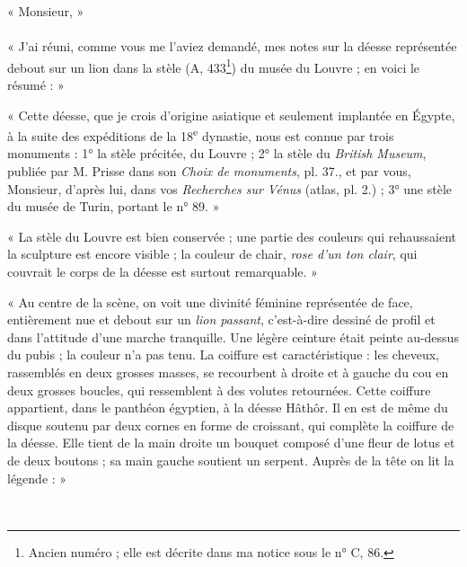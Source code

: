 \documentclass{article}
\newcommand*\hieroAAAG{}
\newcommand*\hieroAAAH{}
\newcommand*\hieroAAAI{}
\newcommand*\hieroAAAJ{}
\newcommand*\hieroAAAK{}
\newcommand*\hieroAAAL{}
\newcommand*\hieroAAAM{}
\newcommand*\hieroAAAN{}
\begin{document}
\begin{center}
« Monsieur, »
\end{center}

\paragraph{}
« J'ai réuni, comme vous me l'aviez demandé, mes notes sur la déesse représentée debout sur un lion dans la stèle (A, 433\footnote{Ancien numéro ; elle est décrite dans ma notice sous le n° C, 86.}) du musée du Louvre ; en voici le résumé : »

« Cette déesse, que je crois d'origine asiatique et seulement implantée en Égypte, à la suite des expéditions de la 18\textsuperscript{e} dynastie, nous est connue par trois monuments : 1° la stèle précitée, du Louvre ; 2° la stèle du \emph{British Museum}, publiée par M. Prisse dans son \emph{Choix de monuments}, pl. 37., et par vous, Monsieur, d'après lui, dans vos \emph{Recherches sur Vénus} (atlas, pl. 2.) ; 3° une stèle du musée de Turin, portant le n° 89. »

« La stèle du Louvre est bien conservée ; une partie des couleurs qui rehaussaient la sculpture est encore visible ; la couleur de chair, \emph{rose d'un ton clair}, qui couvrait le corps de la déesse est surtout remarquable. »

« Au centre de la scène, on voit une divinité féminine représentée de face, entièrement nue et debout sur un \emph{lion passant}, c'est-à-dire dessiné de profil et dans l'attitude d'une marche tranquille. Une légère ceinture était peinte au-dessus du pubis ; la couleur n'a pas tenu. La coiffure est caractéristique : les cheveux, rassemblés en deux grosses masses, se recourbent à droite et à gauche du cou en deux grosses boucles, qui ressemblent à des volutes retournées. Cette coiffure appartient, dans le panthéon égyptien, à la déesse Hâthôr. Il en est de même du disque soutenu par deux cornes en forme de croissant, qui complète la coiffure de la déesse. Elle tient de la main droite un bouquet composé d'une fleur de lotus et de deux boutons ; sa main gauche soutient un serpent. Auprès de la tête on lit la légende : »

\begin{center}
$\hieroAAAG\:\hieroAAAH\:\hieroAAAI\:\:\:\:\:\:\:\:\:\:\hieroAAAJ\:\:\:\:\:\:\:\:\:\:\hieroAAAK\:\hieroAAAL\:\:\:\:\:\:\:\:\:\:\hieroAAAM\:\hieroAAAM\:\hieroAAAM\:\:\:\:\:\:\:\:\:\:\hieroAAAN$
\end{center}
\end{document}
